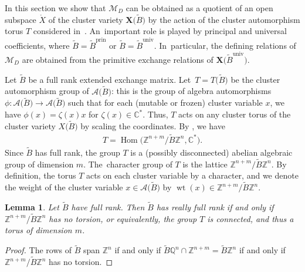 \documentclass[10pt,a4paper]{amsart}
\def\C{{\mathbb C}}
\def\Z{{\mathbb Z}}
\def\Q{{\mathbb Q}}
\def\A{{\mathcal{A}}}
\def\Xo{{\mathring{X}}}
\def\Hom{\operatorname{Hom}}
\def\prin{{\operatorname{prin}}}
\def\univ{{\operatorname{univ}}}
\def\tB{{\tilde B}}
\def\wt{\operatorname{wt}}
\def\M{{\mathcal{M}}}
\def\tB{{\tilde B}}
\def\X{{\mathbf X}}
\numberwithin{equation}{section}
\newtheorem{Lemma}[Theorem]{Lemma}
\begin{document}
In this section we show that $\M_D$ can be obtained as a quotient of an open subspace $\Xo$ of the cluster variety $\X\big(\tB\big)$ by the action of the cluster automorphism torus $T$ considered in~\cite{LS}. An~important role is played by principal and universal coefficients, where $\tB = \tB^\prin$ or \mbox{$\tB=\tB^\univ$}. In~particular, the defining relations of $\M_D$ are obtained from the primitive exchange relations of $\X\big(\tB^\univ\big)$.

\bigskip{}
Let $\tB$ be a full rank extended exchange matrix. Let~$T = T\big(\tB\big)$ be the cluster automorphism group \cite{LS} of $\A\big(\tB\big)$: this is the group of algebra automorphisms $\phi\colon \A\big(\tB\big) \to \A\big(\tB\big)$ such that for each (mutable or frozen) cluster variable $x$, we have $\phi(x) = \zeta(x) x$ for $\zeta(x) \in \C^\ast$. Thus, $T$ acts on any cluster torus of the cluster variety $X\big(\tB\big)$ by scaling the coordinates. By \cite[Proposition~5.1]{LS}, we have
\begin{gather}\label{eq:auto}
T = \Hom\big(\Z^{n+m}/\tB \Z^n, \C^\ast\big).
\end{gather}
Since $\tB$ has full rank, the group $T$ is a (possibly disconnected) abelian algebraic group of dimension $m$. The~character group of $T$ is the lattice $\Z^{n+m}/\tB \Z^n$. By definition, the torus $T$ acts on each cluster variable by a character, and we denote the weight of the cluster variable $x \in \A\big(\tB\big)$ by $\wt(x) \in \Z^{n+m}/\tB \Z^n$.

\begin{Lemma}
Let $\tB$ have full rank. Then $\tB$ has really full rank if and only if $\Z^{n+m}/\tB \Z^n$ has no torsion, or equivalently, the group $T$ is connected, and thus a torus of dimension $m$.
\end{Lemma}
\begin{proof}
The rows of $\tB$ span $\Z^n$ if and only if $\tB \Q^n \cap \Z^{n+m} = \tB \Z^n$ if and only if $\Z^{n+m}/\tB \Z^n$ has no torsion.
\end{proof}
\end{document}
